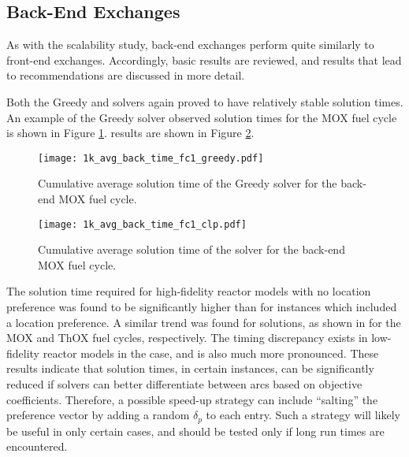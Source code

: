 \subsection{Back-End Exchanges}

As with the scalability study, back-end exchanges perform quite similarly to
front-end exchanges. Accordingly, basic results are reviewed, and results that
lead to recommendations are discussed in more detail.


Both the Greedy and \clp solvers again proved to have relatively stable solution
times. An example of the Greedy solver observed solution times for the MOX fuel
cycle is shown in Figure \ref{fig:1k_avg_back_time_fc1_greedy}. \clp results are
shown in Figure \ref{fig:1k_avg_back_time_fc1_clp}. 

\begin{figure}[h!]
  \begin{center}
    \texttt{[image: 1k\_avg\_back\_time\_fc1\_greedy.pdf]}
    \caption{
      \label{fig:1k_avg_back_time_fc1_greedy}
      Cumulative average solution time of the Greedy solver for the back-end MOX
      fuel cycle.}
  \end{center}
\end{figure}

\begin{figure}[h!]
  \begin{center}
    \texttt{[image: 1k\_avg\_back\_time\_fc1\_clp.pdf]}
    \caption{
      \label{fig:1k_avg_back_time_fc1_clp}
      Cumulative average solution time of the \clp solver for the back-end MOX
      fuel cycle.}
  \end{center}
\end{figure}

The \clp solution time required for high-fidelity reactor models with no
location preference was found to be significantly higher than for instances
which included a location preference. A similar trend was found for \cbc
solutions, as shown in
 for the MOX and
ThOX fuel cycles, respectively. The timing discrepancy exists in low-fidelity
reactor models in the \cbc case, and is also much more pronounced. These results
indicate that solution times, in certain instances, can be significantly reduced
if solvers can better differentiate between arcs based on objective
coefficients. Therefore, a possible speed-up strategy can include ``salting''
the preference vector by adding a random $\delta_p$ to each entry. Such a
strategy will likely be useful in only certain cases, and should be tested only
if long run times are encountered.

